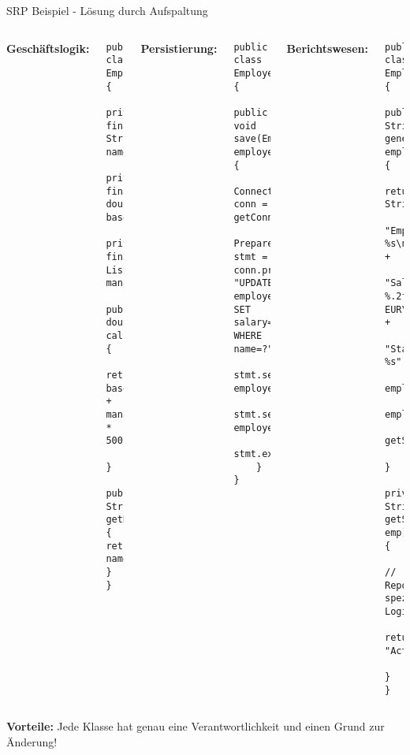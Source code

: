 \begin{frame}[fragile]{SRP Beispiel - Lösung durch Aufspaltung}
  \begin{columns}[T]
    \textbf{Geschäftslogik:}
    \begin{lstlisting}[style=java, basicstyle=\tiny\ttfamily]
public class Employee {
    private final String name;
    private final double baseSalary;
    private final List<EmployeeId> manages;
    public double calculateSalary() {
        return baseSalary + manages.size() * 500.0;
    }
    public String getName() { return name; }
}
    \end{lstlisting}

    \textbf{Persistierung:}
    \begin{lstlisting}[style=java, basicstyle=\tiny\ttfamily]
public class EmployeeRepository {
    public void save(Employee employee) {
        Connection conn = getConnection();
        PreparedStatement stmt = conn.prepareStatement( "UPDATE employees SET salary=? WHERE name=?");
        stmt.setDouble(1, employee.calculateSalary());
        stmt.setString(2, employee.getName());
        stmt.executeUpdate();
    }
}
    \end{lstlisting}

    \textbf{Berichtswesen:}
    \begin{lstlisting}[style=java, basicstyle=\tiny\ttfamily]
public class EmployeeReporter {
    public String generateReport(Employee employee) {
        return String.format(
            "Employee: %s\n" +
            "Salary: %.2f EUR\n" +
            "Status: %s",
            employee.getName(),
            employee.calculateSalary(),
            getStatus(employee));
    }
    private String getStatus(Employee emp) {
        // Report-spezifische Logik
        return "Active";
    }
}
    \end{lstlisting}
  \end{columns}
  \textbf{Vorteile:} Jede Klasse hat genau eine Verantwortlichkeit und einen Grund zur Änderung!
\end{frame}

